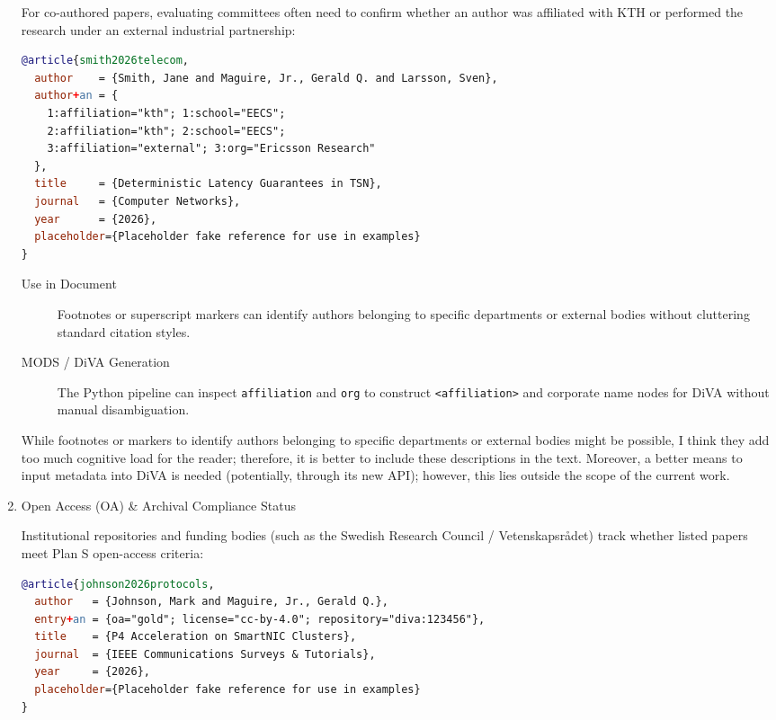 \documentclass[12pt, twoside]{article}
\begin{document}
\begin{enumerate}
For co-authored papers, evaluating committees often need to confirm whether an author was affiliated with \gls{KTH} or performed the research under an external industrial partnership:
\begin{lstlisting}[language={BibTeX}, breaklines=true, basicstyle=\small\ttfamily, escapechar=|, caption={{Storing thesis related metadata}}, label=lst:biberThesisAffiliationMetadata]
@article{smith2026telecom,
  author    = {Smith, Jane and Maguire, Jr., Gerald Q. and Larsson, Sven},
  author+an = {
    1:affiliation="kth"; 1:school="EECS";
    2:affiliation="kth"; 2:school="EECS";
    3:affiliation="external"; 3:org="Ericsson Research"
  },
  title     = {Deterministic Latency Guarantees in TSN},
  journal   = {Computer Networks},
  year      = {2026},
  placeholder={Placeholder fake reference for use in examples}
}
\end{lstlisting}
\begin{description}
    \item[Use in Document] Footnotes or superscript markers can identify authors belonging to specific departments or external bodies without cluttering standard citation styles.
    \item[MODS / DiVA Generation] The Python pipeline can inspect \texttt{affiliation} and \texttt{org} to construct \texttt{<affiliation>} and corporate name nodes for \gls{DiVA} without manual disambiguation.
\end{description}

While footnotes or markers to identify authors belonging to specific departments or external bodies might be possible, I think they add too much cognitive load for the reader; therefore, it is better to include these descriptions in the text. Moreover, a better means to input metadata into \gls{DiVA} is needed (potentially, through its new \gls{API}); however, this lies outside the scope of the current work.
    \item Open Access (OA) \& Archival Compliance Status

Institutional repositories and funding bodies (such as the Swedish Research Council / \foreignlanguage{swedish}{Vetenskapsrådet}) track whether listed papers meet Plan S open-access criteria:
\begin{lstlisting}[language={BibTeX}, breaklines=true, basicstyle=\small\ttfamily,  escapechar=|, caption={{Storing Open Access (OA) \& Archival Compliance Status}}, label=lst:biberOAMetadata]
@article{johnson2026protocols,
  author   = {Johnson, Mark and Maguire, Jr., Gerald Q.},
  entry+an = {oa="gold"; license="cc-by-4.0"; repository="diva:123456"},
  title    = {P4 Acceleration on SmartNIC Clusters},
  journal  = {IEEE Communications Surveys & Tutorials},
  year     = {2026},
  placeholder={Placeholder fake reference for use in examples}
}
\end{lstlisting}


\end{enumerate}
\end{document}
